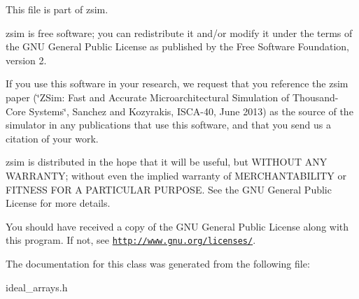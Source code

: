 This file is part of zsim.

zsim is free software; you can redistribute it and/or modify it under the terms of the G\-N\-U General Public License as published by the Free Software Foundation, version 2.

If you use this software in your research, we request that you reference the zsim paper (\char`\"{}\-Z\-Sim\-: Fast and Accurate Microarchitectural Simulation of
\-Thousand-\/\-Core Systems\char`\"{}, Sanchez and Kozyrakis, I\-S\-C\-A-\/40, June 2013) as the source of the simulator in any publications that use this software, and that you send us a citation of your work.

zsim is distributed in the hope that it will be useful, but W\-I\-T\-H\-O\-U\-T A\-N\-Y W\-A\-R\-R\-A\-N\-T\-Y; without even the implied warranty of M\-E\-R\-C\-H\-A\-N\-T\-A\-B\-I\-L\-I\-T\-Y or F\-I\-T\-N\-E\-S\-S F\-O\-R A P\-A\-R\-T\-I\-C\-U\-L\-A\-R P\-U\-R\-P\-O\-S\-E. See the G\-N\-U General Public License for more details.

You should have received a copy of the G\-N\-U General Public License along with this program. If not, see \href{http://www.gnu.org/licenses/}{\tt http\-://www.\-gnu.\-org/licenses/}. 

The documentation for this class was generated from the following file\-:\begin{DoxyCompactItemize}
\item 
ideal\-\_\-arrays.\-h\end{DoxyCompactItemize}
